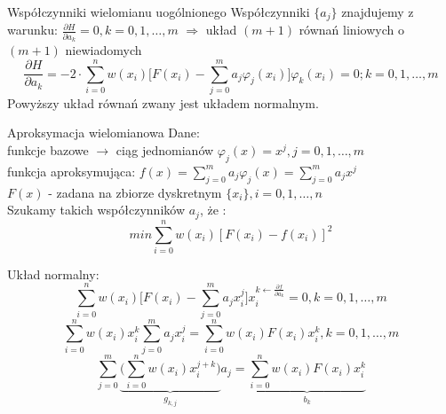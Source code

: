 \begin{frame}{Współczynniki wielomianu uogólnionego}
    Współczynniki $\{a_j\}$ znajdujemy z warunku: $\frac{\partial H}{\partial a_k} = 0, k=0,1,\ldots,m$
    $\Rightarrow$ układ $(m+1)$ równań liniowych o $(m+1)$ niewiadomych
    $$\frac{\partial H}{\partial a_k} = -2 \cdot \sum_{i=0}^{n}w(x_i)\bigg[F(x_i)-\sum_{j=0}^{m}a_j\varphi_j(x_i)\bigg]\varphi_k(x_i)=0;k=0,1,\ldots,m$$
   Powyższy układ równań zwany jest układem normalnym.
\end{frame}
\begin{frame}{Aproksymacja wielomianowa}
	Dane:\\
	
	funkcje bazowe $\rightarrow$ ciąg jednomianów $\varphi_j(x) = x^j,j=0,1,\ldots,m$\\
	\vspace{0.5cm}
    funkcja aproksymująca: $f(x) = \sum_{j=0}^{m}a_j\varphi_j(x)=\sum_{j=0}^{m}a_jx^j$ \\
    \vspace{0.5cm}
    $F(x)$ - zadana na zbiorze dyskretnym $\{x_i\},i=0,1,\ldots,n$\\
    \vspace{0.5cm}
    Szukamy takich współczynników $a_j$, że :\\
    $$min\sum_{i=0}^{n}w(x_i)[F(x_i)-f(x_i)]^2 $$
\end{frame}
\begin{frame}
    Układ normalny:
    $$\sum_{i=0}^{n}w(x_i)\bigg[F(x_i)-\sum_{j=0}^{m}a_jx_i^j\bigg]x_i^{k\leftarrow\frac{\partial f}{\partial a_k}}=0,k=0,1,\ldots,m$$
    $$\sum_{i=0}^{n}w(x_i)x_i^k\sum_{j=0}^{m}a_jx_i^j=\sum_{i=0}^{n}w(x_i)F(x_i)x_i^k,k=0,1,\ldots,m$$
    $$\sum_{j=0}^{m}\underbrace{\bigg(\sum_{i=0}^{n}w(x_i)x_i^{j+k}\bigg)}_{g_{k,j}}a_j = \underbrace{\sum_{i=0}^{n}w(x_i)F(x_i)x_i^k}_{b_k}$$
\end{frame}
